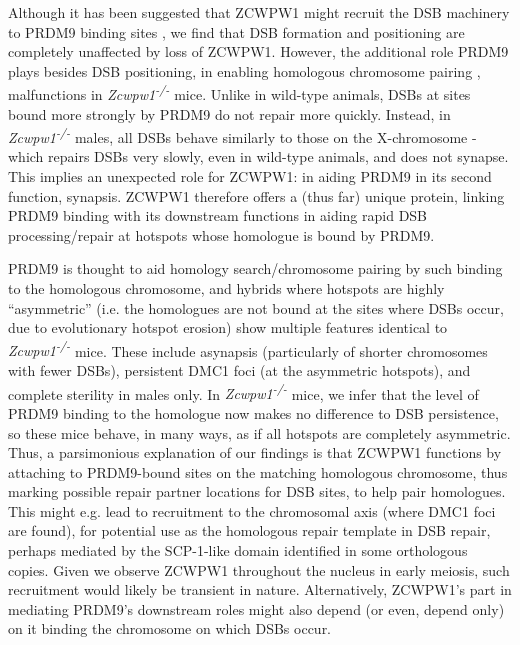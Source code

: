 Although it has been suggested that ZCWPW1 might recruit the DSB machinery to PRDM9 binding sites \parencite{Li2019histone, Spruce2019HELLS}, we find that DSB formation and positioning are completely unaffected by loss of ZCWPW1. However, the additional role PRDM9 plays besides DSB positioning, in enabling homologous chromosome pairing \parencite{Davies2016Reengineering}, malfunctions in \textit{Zcwpw1\textsuperscript{-/-}} mice. Unlike in wild-type animals, DSBs at sites bound more strongly by PRDM9 do not repair more quickly. Instead, in \textit{Zcwpw1\textsuperscript{-/-}} males, all DSBs behave similarly to those on the X-chromosome - which repairs DSBs very slowly, even in wild-type animals, and does not synapse. This implies an unexpected role for ZCWPW1: in aiding PRDM9 in its second function, synapsis. ZCWPW1 therefore offers a (thus far) unique protein, linking PRDM9 binding with its downstream functions \parencite{Davies2016Reengineering, Hinch2019Factors, Li2019highresolution} in aiding rapid DSB processing/repair at hotspots whose homologue is bound by PRDM9.

PRDM9 is thought to aid homology search/chromosome pairing by such binding to the homologous chromosome, and hybrids where hotspots are highly “asymmetric” (i.e. the homologues are not bound at the sites where DSBs occur, due to evolutionary hotspot erosion) show multiple features identical to \textit{Zcwpw1\textsuperscript{-/-}} mice. These include asynapsis (particularly of shorter chromosomes with fewer DSBs), persistent DMC1 foci (at the asymmetric hotspots), and complete sterility in males only. In \textit{Zcwpw1\textsuperscript{-/-}} mice, we infer that the level of PRDM9 binding to the homologue now makes no difference to DSB persistence, so these mice behave, in many ways, as if all hotspots are completely asymmetric. Thus, a parsimonious explanation of our findings is that ZCWPW1 functions by attaching to PRDM9-bound sites on the matching homologous chromosome, thus marking possible repair partner locations for DSB sites, to help pair homologues. This might e.g. lead to recruitment to the chromosomal axis (where DMC1 foci are found), for potential use as the homologous repair template in DSB repair, perhaps mediated by the SCP-1-like domain identified in some orthologous copies. Given we observe ZCWPW1 throughout the nucleus in early meiosis, such recruitment would likely be transient in nature. Alternatively, ZCWPW1’s part in mediating PRDM9’s downstream roles might also depend (or even, depend only) on it binding the chromosome on which DSBs occur.


